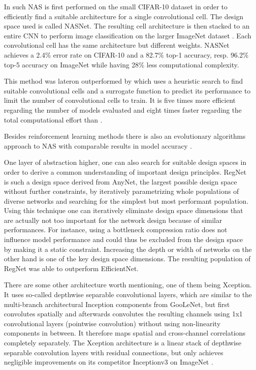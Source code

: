 In \cite{BarretZoph.2018} such NAS is first performed on the small CIFAR-10 dataset \cite{AlexKrizhevsky.2009} in order to efficiently find a suitable architecture for a single convolutional cell. The design space used is called NASNet. The resulting cell architecture is then stacked to an entire CNN to perform image classification on the larger ImageNet dataset \cite{JiaDeng.2009}. Each convolutional cell has the same architecture but different weights. NASNet achieves a 2.4\% error rate on CIFAR-10 \cite{AlexKrizhevsky.2009} and a 82.7\% top-1 accuracy, resp. 96.2\% top-5 accuracy on ImageNet \cite{JiaDeng.2009} while having 28\% less computational complexity. 

This method was lateron outperformed by \cite{ChenxiLiu.2018} which uses a heuristic search to find suitable convolutional cells and a surrogate function to predict its performance to limit the number of convolutional cells to train. It is five times more efficient regarding the number of models evaluated and eight times faster regarding the total computational effort than \cite{BarretZoph.2018}. 

Besides reinforcement learning methods there is also an evolutionary algorithms approach to NAS with comparable results in model accuracy \cite{EstebanReal.2019}.

One layer of abstraction higher, one can also search for suitable design spaces in order to derive a common understanding of important design principles. RegNet is such a design space derived from AnyNet, the largest possible design space without further constraints, by iteratively parametrizing whole populations of diverse networks and searching for the simplest but most performant population. Using this technique one can iteratively eliminate design space dimensions that are actually not too important for the network design because of similar performances. For instance, using a bottleneck compression ratio does not influence model performance and could thus be excluded from the design space by making it a static constraint. Increasing the depth or width of networks on the other hand is one of the key design space dimensions. The resulting population of RegNet was able to outperform EfficientNet. \cite{IlijaRadosavovic.2020}

There are some other architecture worth mentioning, one of them being Xception. It uses so-called depthwise separable convolutional layers, which are similar to the multi-branch architectural Inception components from GooLeNet, but first convolutes spatially and afterwards convolutes the resulting channels using 1x1 convolutional layers (pointwise convolution) without using non-linearity components in between. It therefore maps spatial and cross-channel correlations completely separately. The Xception architecture is a linear stack of depthwise separable convolution layers with residual connections, but only achieves negligible improvements on its competitor Inceptionv3 on ImageNet \cite{JiaDeng.2009}. \cite{FrancoisChollet.2017}

